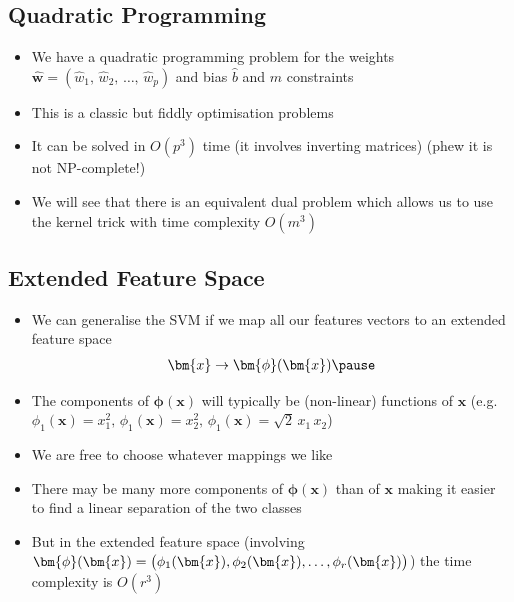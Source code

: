 \begin{slide}
\section{Quadratic Programming}

\begin{PauseHighLight}
  \begin{itemize}
  \item We have a quadratic programming problem for the weights
    $\hat{\bm{w}} = (\hat{w}_1,\,\hat{w}_2,\,\ldots,\,\hat{w}_p)$ and
    bias $\hat{b}$ and $m$ constraints\pause
  \item This is a classic but fiddly optimisation problems\pause
  \item It can be solved in $O(p^3)$ time (it involves inverting
    matrices)\pause{} (phew it is not NP-complete!)\pauseb
  \item We will see that there is an equivalent dual problem which
    allows us to use the kernel trick with time complexity $O(m^3)$\pause
  \end{itemize}
\end{PauseHighLight}

\end{slide}


\Outline %

\begin{slide}
\section[-2]{Extended Feature Space}

\begin{PauseHighLight}
  \begin{itemize}
  \item We can generalise the SVM if we map all our features vectors
    to an extended feature space
    \begin{align*}
      \bm{x} \rightarrow \bm{\phi}(\bm{x})\pause
    \end{align*}
  \item The components of $\bm{\phi}(\bm{x})$ will typically be
    (non-linear) functions of $\bm{x}$ (e.g. $\phi_1(\bm{x}) = x_1^2,
    \, \phi_1(\bm{x}) = x_2^2,\, \phi_1(\bm{x}) = \sqrt{2}\,
    x_1\,x_2$)\pause
  \item We are free to choose whatever mappings we like\pause
  \item There may be many more components of $\bm{\phi}(\bm{x})$ than
    of $\bm{x}$\pause{} making it easier to find a linear separation
    of the two classes\pauseb
      \item But in the extended feature space (involving
    $\bm{\phi}(\bm{x}) = \left(\strut \phi_1(\bm{x}), \phi_2(\bm{x}), \ldots,
      \phi_r(\bm{x})\right)$) the time complexity is $O(r^3)$\pause
  \end{itemize}
\end{PauseHighLight}

\end{slide}

